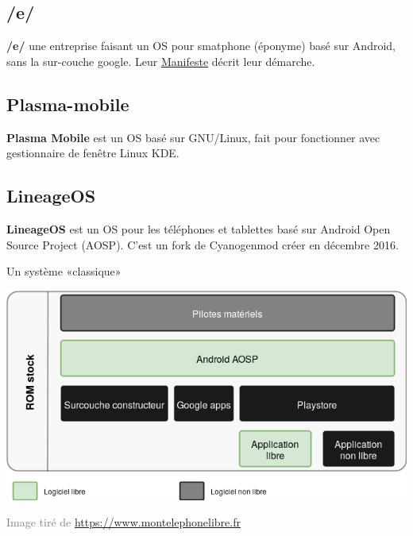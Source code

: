 \documentclass[aspectratio=169]{beamer}
\begin{document}
\subsection{/e/}
\begin{frame}
\textbf{/e/} une entreprise faisant un OS pour smatphone (éponyme) basé sur Android, sans la sur-couche google.\newline
\newline
Leur \href{https://e.foundation/wp-content/uploads/ManifesteFR.pdf}{Manifeste} décrit leur démarche.
\end{frame}

\subsection{Plasma-mobile}
\begin{frame}
\textbf{Plasma Mobile} est un OS basé sur GNU/Linux, fait pour fonctionner avec gestionnaire de fenêtre Linux KDE.
\end{frame}

\subsection{LineageOS}

\begin{frame}
\textbf{LineageOS} est un OS pour les téléphones et tablettes basé sur Android Open Source Project (AOSP).\newline
\newline
C'est un fork de Cyanogenmod créer en décembre 2016.
\end{frame}

\begin{frame}{Un système «classique»}
\begin{center}
\includegraphics[width=.75\textwidth]{schemas/Android_private.png}
\end{center}
\textcolor{gray}{\tiny{Image tiré de \url{https://www.montelephonelibre.fr}}}
\end{frame}
\end{document}
